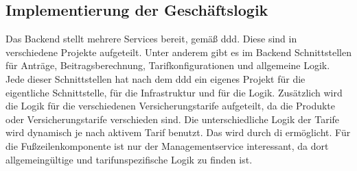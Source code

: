\subsection{Implementierung der Geschäftslogik}
\label{geschaeftslogikimplementieren}
Das Backend stellt mehrere Services bereit, gemäß \gls{ddd}. Diese sind in verschiedene Projekte aufgeteilt. Unter anderem gibt es im Backend Schnittstellen für Anträge, Beitragsberechnung, Tarifkonfigurationen und allgemeine Logik. Jede dieser Schnittstellen hat nach dem \gls{ddd} ein eigenes Projekt für die eigentliche Schnittstelle, für die Infrastruktur und für die Logik. Zusätzlich wird die Logik für die verschiedenen Versicherungstarife aufgeteilt, da die Produkte oder Versicherungstarife verschieden sind. Die unterschiedliche Logik der Tarife wird dynamisch je nach aktivem Tarif benutzt. Das wird durch \gls{di} ermöglicht. Für die Fußzeilenkomponente ist nur der Managementservice interessant, da dort allgemeingültige und tarifunspezifische Logik zu finden ist.\\

